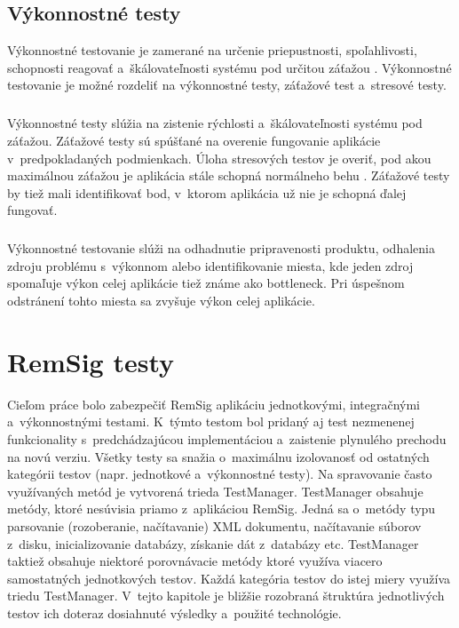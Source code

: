 \documentclass[
  digital, %
  table,   %
oneside,
  nolof,     %
  nolot,     %
]{fithesis3}
\begin{document}
\section{Výkonnostné testy}
Výkonnostné testovanie je zamerané na určenie priepustnosti, spoľahlivosti, schopnosti reagovať a~škálovateľnosti systému pod určitou záťažou \cite{ssl3.0}\cite{perfromanceTest}. Výkonnostné testovanie je možné rozdeliť na výkonnostné testy, záťažové test a~stresové testy.\paragraph{}
Výkonnostné testy slúžia na zistenie rýchlosti a~škálovateľnosti systému pod záťažou. Záťažové testy sú spúšťané na overenie fungovanie aplikácie v~predpokladaných podmienkach. Úloha stresových  testov je overiť, pod akou maximálnou záťažou je aplikácia stále schopná normálneho behu \cite{effectiveSoftwareTesting}. Záťažové testy by tiež mali identifikovať bod, v~ktorom aplikácia už nie je schopná ďalej fungovať.\paragraph{}
Výkonnostné testovanie slúži na odhadnutie pripravenosti produktu, odhalenia zdroju problému s~výkonnom alebo  identifikovanie miesta, kde jeden zdroj spomaľuje výkon celej aplikácie tiež známe ako bottleneck. Pri úspešnom odstránení tohto miesta sa zvyšuje výkon celej aplikácie.
\chapter{RemSig testy}
Cieľom práce bolo zabezpečiť  RemSig aplikáciu jednotkovými, integračnými a~výkonnostnými testami. K~týmto testom bol pridaný aj test nezmenenej funkcionality s~predchádzajúcou implementáciou a~zaistenie plynulého prechodu na novú verziu. Všetky  testy sa snažia o~maximálnu izolovanosť od ostatných kategórii  testov (napr. jednotkové a~výkonnostné testy). Na spravovanie často využívaných metód je vytvorená trieda TestManager. TestManager obsahuje metódy, ktoré nesúvisia priamo z~aplikáciou RemSig. Jedná sa o~metódy typu parsovanie (rozoberanie, načítavanie) XML dokumentu, načítavanie súborov z~disku, inicializovanie databázy, získanie dát z~databázy etc. TestManager taktiež obsahuje niektoré porovnávacie metódy ktoré využíva viacero samostatných jednotkových testov. Každá kategória testov do istej miery využíva triedu TestManager. V~tejto kapitole je bližšie rozobraná štruktúra jednotlivých testov ich doteraz dosiahnuté výsledky a~použité technológie.
\end{document}
